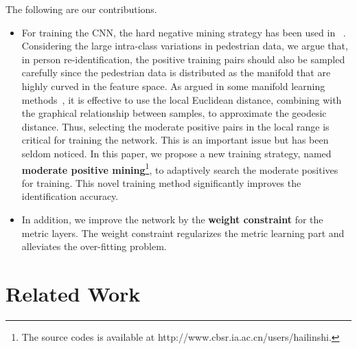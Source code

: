 \documentclass[runningheads]{llncs}
\begin{document}
The following are our contributions.
\begin{itemize}\itemsep=-1pt
    \item For training the CNN, the hard negative mining strategy has been used in ~\cite{ahmed2015improved,parkhi2015deep,schroff2015facenet}.
    Considering the large intra-class variations in pedestrian data, we argue that, in person re-identification,
    the positive training pairs should also be sampled carefully since the pedestrian data is distributed as the manifold that are highly curved in the feature space.
    As argued in some manifold learning methods~\cite{tenenbaum2000global,roweis2000nonlinear,belkin2003laplacian}, it is effective to use the local Euclidean distance, combining with the graphical relationship between samples, to approximate the geodesic distance.
    Thus, selecting the moderate positive pairs in the local range is critical for training the network.
    This is an important issue but has been seldom noticed.
    In this paper, we propose a new training strategy, named \textbf{moderate positive mining}\footnote{The source codes is available at http://www.cbsr.ia.ac.cn/users/hailinshi.
}, to adaptively search the moderate positives for training.
    This novel training method significantly improves the identification accuracy.
    \item In addition, we improve the network by the \textbf{weight constraint} for the metric layers.
    The weight constraint regularizes the metric learning part and alleviates the over-fitting problem.
\end{itemize}












\section{Related Work}
\label{section_Related_work}

\end{document}
